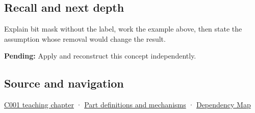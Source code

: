 \subsection{Recall and next depth}\label{appendix-dbe5905163c2-recall-and-next-depth}

Explain bit mask without the label, work the example above, then state the assumption whose removal would change the result.

\textbf{Pending:} Apply and reconstruct this concept independently.

\subsection{Source and navigation}\label{appendix-dbe5905163c2-source-and-navigation}

\hyperref[01-foundations-i-ch001-from-a-signal-to-an-interpretation]{C001 teaching chapter} · \hyperref[appendix-fd090d982a15]{Part definitions and mechanisms} · \hyperref[appendix-4ad47bdd269a]{Dependency Map}
